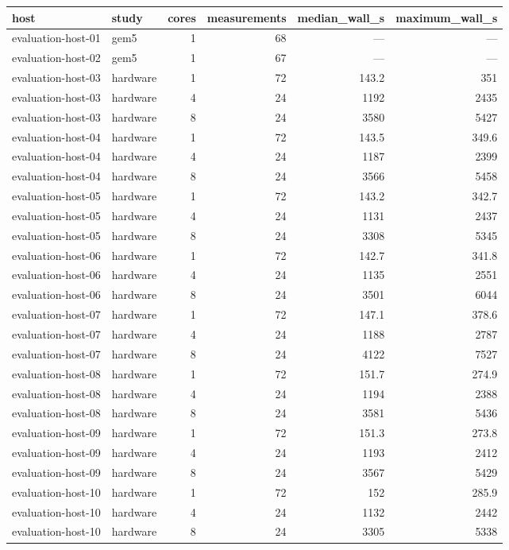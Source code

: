 \begin{tabular}{llrrrr}
\toprule
host & study & cores & measurements & median\_wall\_s & maximum\_wall\_s \\
\midrule
evaluation-host-01 & gem5 & 1 & 68 & — & — \\
evaluation-host-02 & gem5 & 1 & 67 & — & — \\
evaluation-host-03 & hardware & 1 & 72 & 143.2 & 351 \\
evaluation-host-03 & hardware & 4 & 24 & 1192 & 2435 \\
evaluation-host-03 & hardware & 8 & 24 & 3580 & 5427 \\
evaluation-host-04 & hardware & 1 & 72 & 143.5 & 349.6 \\
evaluation-host-04 & hardware & 4 & 24 & 1187 & 2399 \\
evaluation-host-04 & hardware & 8 & 24 & 3566 & 5458 \\
evaluation-host-05 & hardware & 1 & 72 & 143.2 & 342.7 \\
evaluation-host-05 & hardware & 4 & 24 & 1131 & 2437 \\
evaluation-host-05 & hardware & 8 & 24 & 3308 & 5345 \\
evaluation-host-06 & hardware & 1 & 72 & 142.7 & 341.8 \\
evaluation-host-06 & hardware & 4 & 24 & 1135 & 2551 \\
evaluation-host-06 & hardware & 8 & 24 & 3501 & 6044 \\
evaluation-host-07 & hardware & 1 & 72 & 147.1 & 378.6 \\
evaluation-host-07 & hardware & 4 & 24 & 1188 & 2787 \\
evaluation-host-07 & hardware & 8 & 24 & 4122 & 7527 \\
evaluation-host-08 & hardware & 1 & 72 & 151.7 & 274.9 \\
evaluation-host-08 & hardware & 4 & 24 & 1194 & 2388 \\
evaluation-host-08 & hardware & 8 & 24 & 3581 & 5436 \\
evaluation-host-09 & hardware & 1 & 72 & 151.3 & 273.8 \\
evaluation-host-09 & hardware & 4 & 24 & 1193 & 2412 \\
evaluation-host-09 & hardware & 8 & 24 & 3567 & 5429 \\
evaluation-host-10 & hardware & 1 & 72 & 152 & 285.9 \\
evaluation-host-10 & hardware & 4 & 24 & 1132 & 2442 \\
evaluation-host-10 & hardware & 8 & 24 & 3305 & 5338 \\

\end{tabular}
